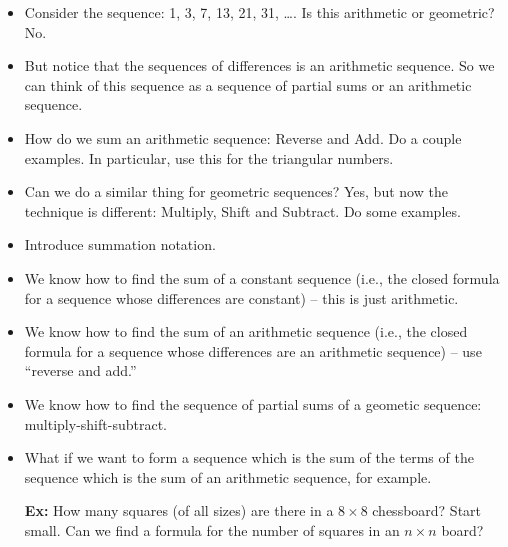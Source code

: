 \documentclass[12pt]{article}
\theoremstyle{plain}
\theoremstyle{definition}
\theoremstyle{remark}
\newcommand{\ex}{\noindent\textbf{Ex:} }
\begin{document}
\begin{itemize}
  \item Consider the sequence: 1, 3, 7, 13, 21, 31, \ldots.  Is this arithmetic or geometric?  No.

  \item But notice that the sequences of differences is an arithmetic sequence.  So we can think of this sequence as a sequence of partial sums or an arithmetic sequence.

  \item How do we sum an arithmetic sequence: Reverse and Add.  Do a couple examples.  In particular, use this for the triangular numbers.

  \item Can we do a similar thing for geometric sequences?
  Yes, but now the technique is different: Multiply, Shift and Subtract.  Do some examples.

  \item Introduce summation notation.

 \item We know how to find the sum of a constant sequence (i.e., the closed formula for a sequence whose differences are constant) -- this is just arithmetic.

 \item We know how to find the sum of an arithmetic sequence (i.e., the closed formula for a sequence whose differences are an arithmetic sequence) -- use ``reverse and add.''

 \item We know how to find the sequence of partial sums of a geometic sequence: multiply-shift-subtract.

 \item What if we want to form a sequence which is the sum of the terms of the sequence which is the sum of an arithmetic sequence, for example.

 \ex How many squares (of all sizes) are there in a $8\times 8$ chessboard?  Start small.  Can we find a formula for the number of squares in an $n\times n$ board?
 \end{itemize}
\end{document}
